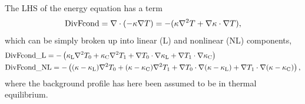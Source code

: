 The LHS of the energy equation has a term
\begin{equation}
\text{DivFcond} = \nabla\cdot\left( -\kappa\nabla T\right) 
= -(\kappa\nabla^2 T + \nabla \kappa\cdot\nabla T),
\end{equation}
which can be simply broken up into linear (L) and nonlinear (NL) components,
\begin{equation}
\begin{split}
&\text{DivFcond\_L} = -\left(\kappa_\text{L}\nabla^2 T_0 
+ \kappa_\text{C} \nabla^2 T_1 
+ \nabla T_0 \cdot \nabla \kappa_\text{L}
+ \nabla T_1 \cdot \nabla \kappa_\text{C}\right) \\
&\text{DivFcond\_NL} = -\left(
(\kappa - \kappa_\text{L})\nabla^2 T_0
+ (\kappa - \kappa_\text{C})\nabla^2 T_1
+ \nabla T_0 \cdot \nabla(\kappa - \kappa_\text{L}) 
+ \nabla T_1 \cdot \nabla(\kappa - \kappa_\text{C}) \right),
\end{split}
\end{equation}
where the background profile has here been assumed to be in thermal equilibrium.


